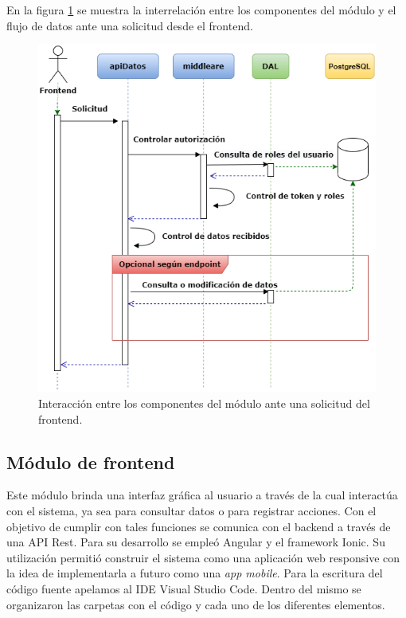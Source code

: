 En la figura \ref{fig:DiagramaInteraccion2} se muestra la interrelación entre los componentes del módulo y el flujo de datos ante una solicitud desde el frontend.

\begin{figure}[ht]
	\centering
	\includegraphics[width=1\textwidth]{./Figures/DiagramaInteraccion2.png}
	\caption{Interacción entre los componentes del módulo ante una solicitud del frontend.}
	\label{fig:DiagramaInteraccion2}
\end{figure}

\subsection{Módulo de frontend}

Este módulo brinda una interfaz gráfica al usuario a través de la cual interactúa con el sistema, ya sea para consultar datos o para registrar acciones. Con el objetivo de cumplir con tales funciones se comunica con el backend a través de una API Rest. Para su desarrollo se empleó Angular y el framework Ionic. Su utilización permitió construir el sistema como una aplicación web responsive con la idea de implementarla a futuro como una \textit{app mobile}. Para la escritura del código fuente apelamos al IDE Visual Studio Code. Dentro del mismo se organizaron las carpetas con el código y cada uno de los diferentes elementos.

